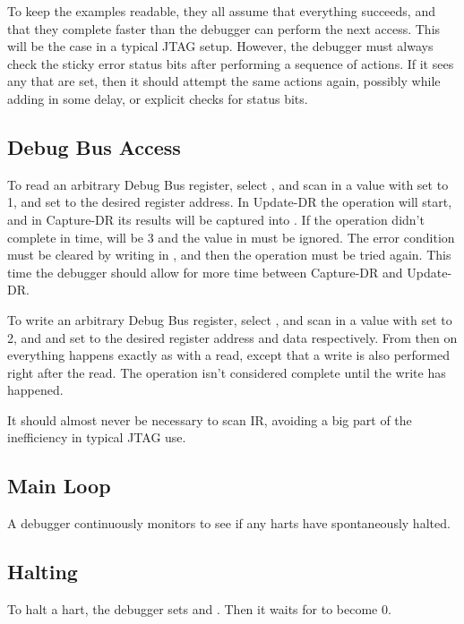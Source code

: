 \documentclass{article}
\begin{document}
To keep the examples readable, they all assume that everything succeeds, and
that they complete faster than the debugger can perform the next access. This
will be the case in a typical JTAG setup. However, the debugger must always
check the sticky error status bits after performing a sequence of actions. If
it sees any that are set, then it should attempt the same actions again,
possibly while adding in some delay, or explicit checks for status bits.

\subsection{Debug Bus Access} \label{dbusaccess}

To read an arbitrary Debug Bus register, select \Rdmi, and scan in a value
with \Fop set to 1, and \Faddress set to the desired register address. In
Update-DR the operation will start, and in Capture-DR its results will be
captured into \Fdata.  If the operation didn't complete in time, \Fop will be 3
and the value in \Fdata must be ignored. The error condition must be cleared by
writing \Fdmireset in \Rdtmcontrol, and then the operation must be tried
again. This time the debugger should allow for more time between Capture-DR and
Update-DR.

To write an arbitrary Debug Bus register, select \Rdmi, and scan in a value
with \Fop set to 2, and \Faddress and \Fdata set to the desired register
address and data respectively. From then on everything happens exactly as with
a read, except that a write is also performed right after the read. The
operation isn't considered complete until the write has happened.

It should almost never be necessary to scan IR, avoiding a big part of the
inefficiency in typical JTAG use.

\subsection{Main Loop}

A debugger continuously monitors \Rhaltsum to see if any harts have spontaneously
halted.

\subsection{Halting} \label{deb:halt}

To halt a hart, the debugger sets \Fhartsel and \Fhaltreq. Then it waits for
\Fhartstatus to become 0.
\end{document}
